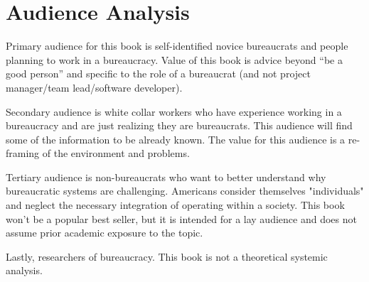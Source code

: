 \section{Audience Analysis}

Primary audience for this book is self-identified novice bureaucrats and people planning to work in a bureaucracy. Value of this book is advice beyond ``be a good person'' and specific to the role of a bureaucrat (and not project manager/team lead/software developer). 

Secondary audience is white collar workers who have experience working in a bureaucracy and are just realizing they are bureaucrats. This audience will find some of the information to be already known.  The value for this audience is a re-framing of the environment and problems. 

Tertiary audience is non-bureaucrats who want to better understand why bureaucratic systems are challenging. Americans consider themselves "individuals" and neglect the necessary integration of operating within a society. This book won't be a popular best seller, but it is intended for a lay audience and does not assume prior academic exposure to the topic.

Lastly, researchers of bureaucracy. This book is not a theoretical systemic analysis. 